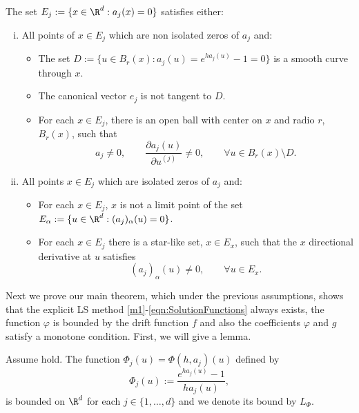 \begin{hypothesis}\label{ass:HypThmSingularities}
	The set $E_j:=\{x\in \R^{d}: a_j(x)=0\}$ satisfies either:
	\begin{enumerate}[(i)]
		\item  All points of  $ x\in E_j$  which are non isolated zeros of $a_j$ and:
			\begin{itemize}
				\item The set $D:=\{u \in B_r(x): a_j(u)=e^{ha_j(u)}-1= 0\}$ 
					is a smooth curve through $x$. 
				\item
					The canonical vector $e_j$ is not
					tangent to $D$.
				\item
					For each $x \in E_j$, there is an open ball with center
					on $x$ and radio $r$, $B_r(x)$, such that  
					$$
						a_j\neq 0, \qquad
						\frac{\partial a_j(u)}{\partial u^{(j)}} \neq 0 ,\qquad 
						\forall u \in B_r(x)
						\setminus D.
					$$	
			\end{itemize}	
		\item
			All points $x \in E_j$ which are isolated zeros of $a_j$ and:
			\begin{itemize}
				\item
					For each $x\in E_j$,  $x$ is not a limit point of the set 
					$E_{\alpha}:=\{u \in \R^d: (a_j)_\alpha(u)=0\}$.
				\item
					For each $x \in E_j$ there is a star-like set, $x\in E_x$, such that
					the $x$ directional derivative at $u$ satisfies
					$$
						 (a_j)_\alpha(u) \neq 0, \qquad \forall u\in E_x.
					$$
			\end{itemize}		
	\end{enumerate}	
\end{hypothesis}
Next we prove our main theorem, which under the previous assumptions, shows that
the explicit LS method  \eqref{m1}-\eqref{eqn:SolutionFunctions} always exists, 
the function $\varphi$ is bounded by the drift function $f$ and also
the coefficients $\varphi$ and $g$ satisfy a monotone condition. First, we will give a lemma.
\begin{lem}\label{l1}
 Assume  hold. The function $\Phi_j(u)=\Phi(h, a_j)(u)$ 
 defined by
 \begin{equation}\label{eqn:ExpBound}
		\Phi_j(u):=\frac{e^{ha_j(u)}-1}{ha_j(u)},
	\end{equation}
	is bounded  on $\R^d$ for each $j\in \{ 1,\dots, d\}$ 
	and we denote its bound by $L_{\Phi}$.
\end{lem}
